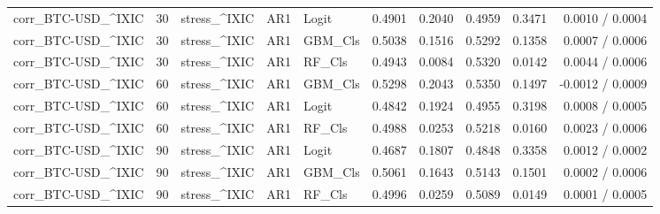 \begin{table}[H]
\begin{tabular}{lllllrrrrr}
corr_BTC-USD_^IXIC & 30 & stress_^IXIC & AR1 & Logit & 0.4901 & 0.2040 & 0.4959 & 0.3471 & 0.0010 / 0.0004 \\
corr_BTC-USD_^IXIC & 30 & stress_^IXIC & AR1 & GBM_Cls & 0.5038 & 0.1516 & 0.5292 & 0.1358 & 0.0007 / 0.0006 \\
corr_BTC-USD_^IXIC & 30 & stress_^IXIC & AR1 & RF_Cls & 0.4943 & 0.0084 & 0.5320 & 0.0142 & 0.0044 / 0.0006 \\
corr_BTC-USD_^IXIC & 60 & stress_^IXIC & AR1 & GBM_Cls & 0.5298 & 0.2043 & 0.5350 & 0.1497 & -0.0012 / 0.0009 \\
corr_BTC-USD_^IXIC & 60 & stress_^IXIC & AR1 & Logit & 0.4842 & 0.1924 & 0.4955 & 0.3198 & 0.0008 / 0.0005 \\
corr_BTC-USD_^IXIC & 60 & stress_^IXIC & AR1 & RF_Cls & 0.4988 & 0.0253 & 0.5218 & 0.0160 & 0.0023 / 0.0006 \\
corr_BTC-USD_^IXIC & 90 & stress_^IXIC & AR1 & Logit & 0.4687 & 0.1807 & 0.4848 & 0.3358 & 0.0012 / 0.0002 \\
corr_BTC-USD_^IXIC & 90 & stress_^IXIC & AR1 & GBM_Cls & 0.5061 & 0.1643 & 0.5143 & 0.1501 & 0.0002 / 0.0006 \\
corr_BTC-USD_^IXIC & 90 & stress_^IXIC & AR1 & RF_Cls & 0.4996 & 0.0259 & 0.5089 & 0.0149 & 0.0001 / 0.0005 \\
\bottomrule
\end{tabular}
\end{table}